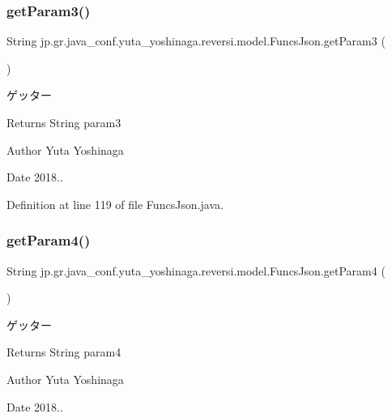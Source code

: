 \subsubsection{\texorpdfstring{get\+Param3()}{getParam3()}}
{\footnotesize\ttfamily String jp.\+gr.\+java\+\_\+conf.\+yuta\+\_\+yoshinaga.\+reversi.\+model.\+Funcs\+Json.\+get\+Param3 (\begin{DoxyParamCaption}{ }\end{DoxyParamCaption})}



ゲッター 

\begin{DoxyReturn}{Returns}
String param3 
\end{DoxyReturn}
\begin{DoxyAuthor}{Author}
Yuta Yoshinaga 
\end{DoxyAuthor}
\begin{DoxyDate}{Date}
2018.. 
\end{DoxyDate}


Definition at line 119 of file Funcs\+Json.\+java.

\mbox{\label{classjp_1_1gr_1_1java__conf_1_1yuta__yoshinaga_1_1reversi_1_1model_1_1_funcs_json_ae5c17deee7b34a5e3ed92555531bf34f}} 
\subsubsection{\texorpdfstring{get\+Param4()}{getParam4()}}
{\footnotesize\ttfamily String jp.\+gr.\+java\+\_\+conf.\+yuta\+\_\+yoshinaga.\+reversi.\+model.\+Funcs\+Json.\+get\+Param4 (\begin{DoxyParamCaption}{ }\end{DoxyParamCaption})}



ゲッター 

\begin{DoxyReturn}{Returns}
String param4 
\end{DoxyReturn}
\begin{DoxyAuthor}{Author}
Yuta Yoshinaga 
\end{DoxyAuthor}
\begin{DoxyDate}{Date}
2018.. 
\end{DoxyDate}


